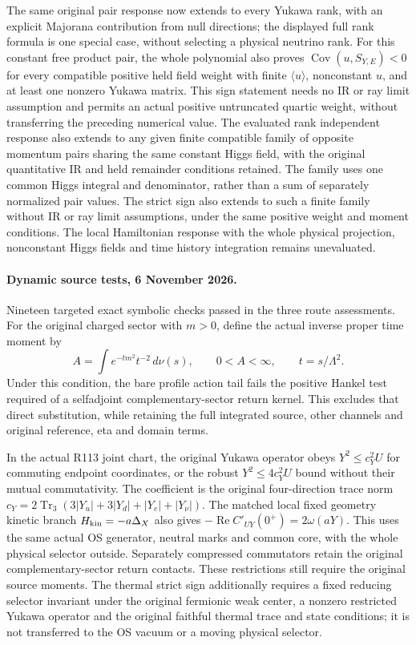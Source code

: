 The same original pair response now extends to every Yukawa rank,
with an explicit Majorana contribution from null directions; the displayed
full rank formula is one special case, without selecting a physical
neutrino rank. For this constant free product pair, the whole polynomial
also proves \(\operatorname{Cov}(u,S_{Y,E})<0\) for every compatible
positive held field weight with finite \(\langle u\rangle\), nonconstant
\(u\), and at least one nonzero Yukawa matrix. This sign statement needs
no IR or ray limit assumption and permits an actual positive untruncated
quartic weight, without transferring the preceding numerical value.
The evaluated rank independent response also extends to any given finite
compatible family of opposite momentum pairs sharing the same constant
Higgs field, with the original quantitative IR and held remainder conditions
retained. The family uses one common Higgs integral and denominator, rather
than a sum of separately normalized pair values. The strict sign also
extends to such a finite family without IR or ray limit assumptions,
under the same positive weight and moment conditions.
The local Hamiltonian response with the whole physical projection,
nonconstant Higgs fields and time history integration remains unevaluated.

\paragraph{Dynamic source tests, 6 November 2026.}
Nineteen targeted exact symbolic checks passed in the three route assessments.
For the original charged sector with \(m>0\), define the actual inverse
proper time moment by
\[
A=\int e^{-tm^2}t^{-2}\,d\nu(s),\qquad
0<A<\infty,\qquad t=s/\Lambda^2.
\]
Under this condition, the bare profile action tail fails the positive
Hankel test required
of a selfadjoint complementary-sector return kernel. This excludes that
direct substitution, while retaining the full integrated source, other
channels and original reference, eta and domain terms.

In the actual R113 joint chart, the original Yukawa operator obeys
\(Y^2\le c_Y^2U\) for commuting endpoint coordinates, or the robust
\(Y^2\le4c_Y^2U\) bound without their mutual commutativity.
The coefficient is the original four-direction trace norm
\(c_Y=2\operatorname{Tr}_3(3|Y_u|+3|Y_d|+|Y_e|+|Y_\nu|)\).
The matched local fixed geometry kinetic branch \(H_{\rm kin}=-a\Delta_X\)
also gives \(-\operatorname{Re}C'_{UY}(0^+)=2\omega(aY)\).
This uses the same actual OS generator, neutral marks and common core,
with the whole physical selector outside. Separately compressed
commutators retain the original complementary-sector return contacts.
These restrictions still require the original source moments.
The thermal strict sign additionally requires a fixed reducing selector
invariant under the original fermionic weak center, a nonzero restricted
Yukawa operator and the original faithful thermal trace and state conditions;
it is not transferred to the OS vacuum or a moving physical selector.

